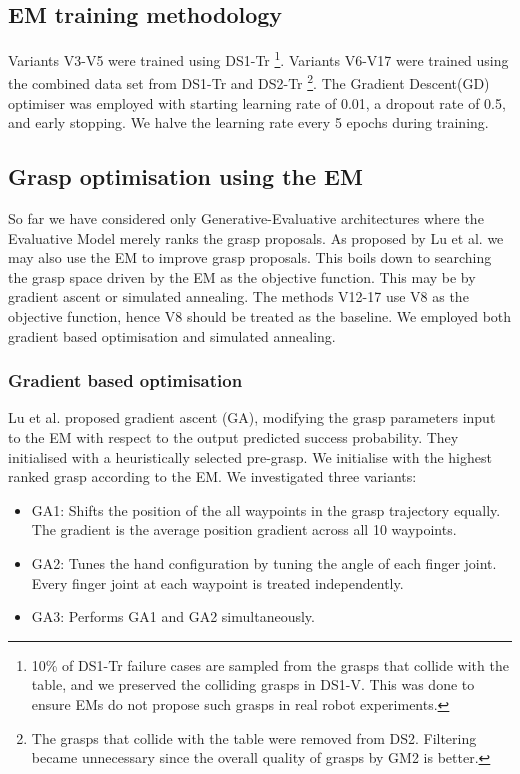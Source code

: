 \subsection{EM training methodology}
\noindent
Variants V3-V5 were trained using DS1-Tr \footnote{10\% of DS1-Tr failure cases are sampled from the grasps that collide with the table, and we preserved the colliding grasps in DS1-V. This was done to ensure EMs do not propose such grasps in real robot experiments.}. Variants V6-V17 were trained using the combined data set from DS1-Tr and DS2-Tr \footnote{The grasps that collide with the table were removed from DS2. Filtering became unnecessary since the overall quality of grasps by GM2 is better.}. The Gradient Descent(GD) optimiser was employed with starting learning rate of 0.01, a dropout rate of 0.5, and early stopping. We halve the learning rate every 5 epochs during training.

\subsection{Grasp optimisation using the EM}
\noindent
So far we have considered only Generative-Evaluative architectures where the Evaluative Model merely ranks the grasp proposals. As proposed by Lu et al. \cite{lu2017planning} we may also use the EM to improve grasp proposals. This boils down to searching the grasp space driven by the EM as the objective function. This may be by gradient ascent or simulated annealing. The methods V12-17 use V8 as the objective function, hence V8 should be treated as the baseline. We employed both gradient based optimisation and simulated annealing.

\subsubsection{Gradient based optimisation}
\noindent
Lu et al. \cite{lu2017planning} proposed gradient ascent (GA), modifying the grasp parameters input to the EM with respect to the output predicted success probability. They initialised with a heuristically selected pre-grasp. We initialise with the highest ranked grasp according to the EM. We investigated three variants:
\begin{itemize}
\item GA1: Shifts the position of the all waypoints in the grasp trajectory equally. The gradient is the average position gradient across all 10 waypoints.
\item GA2: Tunes the hand configuration by tuning the angle of each finger joint. Every finger joint at each waypoint is treated independently.
\item GA3: Performs GA1 and GA2 simultaneously.
\end{itemize}


